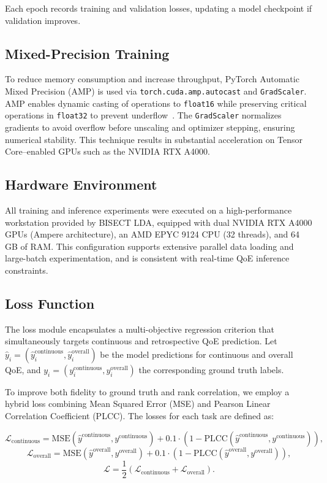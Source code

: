 Each epoch records training and validation losses, updating a model checkpoint if validation improves.

\subsection{Mixed-Precision Training}
To reduce memory consumption and increase throughput, PyTorch Automatic Mixed Precision (AMP) is used via \texttt{torch.cuda.amp.autocast} and \texttt{GradScaler}. AMP enables dynamic casting of operations to \texttt{float16} while preserving critical operations in \texttt{float32} to prevent underflow~\cite{micikevicius2018mixed}. The \texttt{GradScaler} normalizes gradients to avoid overflow before unscaling and optimizer stepping, ensuring numerical stability. This technique results in substantial acceleration on Tensor Core–enabled GPUs such as the NVIDIA RTX A4000.

\subsection{Hardware Environment}
All training and inference experiments were executed on a high-performance workstation provided by BISECT LDA, equipped with dual NVIDIA RTX A4000 GPUs (Ampere architecture), an AMD EPYC 9124 CPU (32 threads), and 64 GB of RAM. This configuration supports extensive parallel data loading and large-batch experimentation, and is consistent with real-time QoE inference constraints.

\subsection{Loss Function}

The loss module encapsulates a multi-objective regression criterion that simultaneously targets continuous and retrospective QoE prediction. Let \( \hat{y}_i = (\hat{y}^{\text{continuous}}_i, \hat{y}^{\text{overall}}_i) \) be the model predictions for continuous and overall QoE, and \( y_i = (y^{\text{continuous}}_i, y^{\text{overall}}_i) \) the corresponding ground truth labels. 

To improve both fidelity to ground truth and rank correlation, we employ a hybrid loss combining Mean Squared Error (MSE) and Pearson Linear Correlation Coefficient (PLCC). The losses for each task are defined as:

\begin{equation}
\mathcal{L}_{\text{continuous}} = \text{MSE}(\hat{y}^{\text{continuous}}, y^{\text{continuous}}) + 0.1 \cdot (1 - \text{PLCC}(\hat{y}^{\text{continuous}}, y^{\text{continuous}})),
\end{equation}
\begin{equation}
\mathcal{L}_{\text{overall}} = \text{MSE}(\hat{y}^{\text{overall}}, y^{\text{overall}}) + 0.1 \cdot (1 - \text{PLCC}(\hat{y}^{\text{overall}}, y^{\text{overall}})),
\end{equation}
\begin{equation}
\mathcal{L} = \frac{1}{2} (\mathcal{L}_{\text{continuous}} + \mathcal{L}_{\text{overall}}).
\end{equation}

